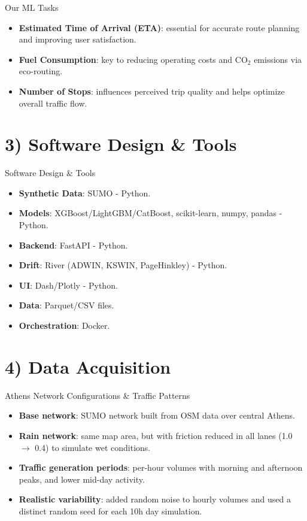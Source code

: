 \documentclass[aspectratio=169]{beamer}
\begin{document}
\begin{frame}{Our ML Tasks}
\begin{itemize}
\item \textbf{Estimated Time of Arrival (ETA)}: essential for accurate route planning and improving user satisfaction.
\item \textbf{Fuel Consumption}: key to reducing operating costs and CO$_2$ emissions via eco-routing.
\item \textbf{Number of Stops}: influences perceived trip quality and helps optimize overall traffic flow.
\end{itemize}
\end{frame}

\section{3) Software Design \& Tools}
\begin{frame}{Software Design \& Tools}
\begin{itemize}
\item \textbf{Synthetic Data}: SUMO - Python.
\item \textbf{Models}: XGBoost/LightGBM/CatBoost, scikit-learn, numpy, pandas - Python.
\item \textbf{Backend}: FastAPI - Python.
\item \textbf{Drift}: River (ADWIN, KSWIN, PageHinkley) - Python.
\item \textbf{UI}: Dash/Plotly - Python.
\item \textbf{Data}: Parquet/CSV files.
\item \textbf{Orchestration}: Docker.
\end{itemize}
\end{frame}

\section{4) Data Acquisition}
\begin{frame}{Athens Network Configurations \& Traffic Patterns}
\begin{itemize}
\item \textbf{Base network}: SUMO network built from OSM data over central Athens.
\item \textbf{Rain network}: same map area, but with friction reduced in all lanes (1.0 $\rightarrow$ 0.4) to simulate wet conditions.
\item \textbf{Traffic generation periods}: per-hour volumes with morning and afternoon peaks, and lower mid-day activity.
\item \textbf{Realistic variability}: added random noise to hourly volumes and used a distinct random seed for each 10h day simulation.
\end{itemize}
\end{frame}
\end{document}
